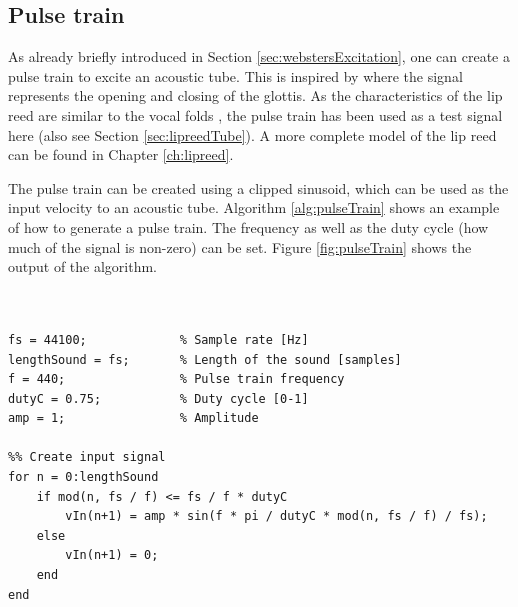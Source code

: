 \subsection{Pulse train}\label{sec:pulseTrain}
As already briefly introduced in Section \ref{sec:webstersExcitation}, one can create a pulse train to excite an acoustic tube. This is inspired by \cite{theBible} where the signal represents the opening and closing of the glottis. As the characteristics of the lip reed are similar to the vocal folds \cite{Richards2003}, the pulse train has been used as a test signal here (also see Section \ref{sec:lipreedTube}). A more complete model of the lip reed can be found in Chapter \ref{ch:lipreed}.

The pulse train can be created using a clipped sinusoid, which can be used as the input velocity to an acoustic tube. Algorithm \ref{alg:pulseTrain} shows an example of how to generate a pulse train. The frequency as well as the duty cycle (how much of the signal is non-zero) can be set. Figure \ref{fig:pulseTrain} shows the output of the algorithm.
\\
\\
\noindent
\begin{minipage}{\textwidth}
\setlstMAT
\begin{lstlisting}[caption={\texttt{MATLAB} code to generate a pulse train.}, label=alg:pulseTrain]
%% Pulse train generator

fs = 44100;             % Sample rate [Hz]
lengthSound = fs;       % Length of the sound [samples]
f = 440;                % Pulse train frequency
dutyC = 0.75;           % Duty cycle [0-1]
amp = 1;                % Amplitude

%% Create input signal
for n = 0:lengthSound
    if mod(n, fs / f) <= fs / f * dutyC
        vIn(n+1) = amp * sin(f * pi / dutyC * mod(n, fs / f) / fs);
    else
        vIn(n+1) = 0;
    end
end
\end{lstlisting}
\end{minipage}

